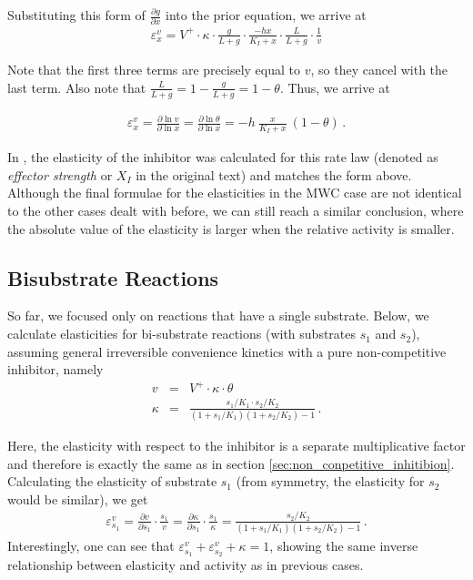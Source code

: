 \documentclass[12pt,a4paper]{article}
\begin{document}
Substituting this form of $\frac{\partial g}{\partial x}$ into the prior equation, we arrive at 
\begin{eqnarray}
\varepsilon_x^v = V^+ \cdot \kappa \cdot \frac{g}{L + g} \cdot \frac{-hx}{K_I + x} \cdot \frac{L}{L + g} \cdot \frac{1}{v}
\end{eqnarray}

\noindent Note that the first three terms are precisely equal to $v$, so they cancel with the last term. Also note that $\frac{L}{L + g} = 1 - \frac{g}{L + g} = 1 - \theta$. Thus, we arrive at

\begin{eqnarray}
\varepsilon_x^v = \frac{\partial \ln{v}}{\partial \ln{x}} = \frac{\partial \ln{\theta}}{\partial \ln{x}} = -h~\frac{x}{K_I + x} ~\left(1 - \theta \right)\,.
\end{eqnarray}

In \cite{Heinrich1974-yj}, the elasticity of the inhibitor was calculated for this rate law (denoted as \emph{effector strength} or $X_I$ in the original text) and matches the form above.
Although the final formulae for the elasticities in the MWC case are not identical to the other cases dealt with before, we can still reach a similar conclusion, where the absolute value of the elasticity is larger when the relative activity is smaller.

\subsection{Bisubstrate Reactions}
So far, we focused only on reactions that have a single substrate. Below, we calculate elasticities for bi-substrate reactions (with substrates $s_1$ and $s_2$), assuming general irreversible convenience kinetics with a pure non-competitive inhibitor, namely
\begin{eqnarray}
v &=& V^+ \cdot \kappa \cdot \theta  \nonumber\\
\kappa &=& \frac{s_1/K_1 \cdot s_2/K_2}{(1 + s_1/K_1) (1 + s_2 / K_2) - 1}\,.
\end{eqnarray}

Here, the elasticity with respect to the inhibitor is a separate multiplicative factor and therefore is exactly the same as in section \ref{sec:non_conpetitive_inhitibion}. Calculating the elasticity of substrate $s_1$ (from symmetry, the elasticity for $s_2$ would be similar), we get
\begin{eqnarray}
\varepsilon^{v}_{s_1} = \frac{\partial v}{\partial s_1} \cdot \frac{s_1}{v}
 = \frac{\partial \kappa}{\partial s_1} \cdot \frac{s_1}{\kappa} 
 = \frac{s_2 / K_2}{(1 + s_1/K_1) (1 + s_2 / K_2) - 1}\,.
\end{eqnarray}
Interestingly, one can see that $\varepsilon^{v}_{s_1} + \varepsilon^{v}_{s_2} + \kappa = 1$, showing the same inverse relationship between elasticity and activity as in previous cases.
\end{document}
